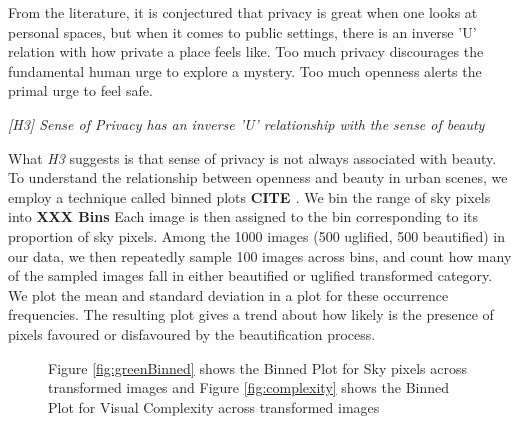 From the literature, it is conjectured that privacy is great when one
looks at personal spaces, but when it comes to public settings, there is an inverse 'U' relation with how private a place feels like. 
Too much privacy discourages the fundamental human urge to explore a mystery. Too much openness  alerts the primal urge to feel safe. 
\par
\textit{[H3] Sense of Privacy has an inverse 'U' relationship with the sense of beauty }
\par
What \textit{H3} suggests is that sense of privacy is not always associated with beauty. 
To understand the relationship between openness and beauty in urban scenes, we employ a technique called binned plots \textbf{CITE \cite{}}. We bin the range of sky pixels into \textbf{XXX Bins}%
Each image is then assigned to the bin corresponding to its proportion of sky pixels. %
Among the 1000 images (500 uglified, 500 beautified) in our data, we then repeatedly sample 100 images across bins, and count how many of the sampled images fall in either beautified or uglified transformed category. We plot the mean and standard deviation in a plot for these occurrence frequencies. The resulting plot gives a trend about how likely is the presence of pixels favoured or disfavoured by the beautification process. 


\begin{figure}[!t]
	\centering
	\hspace*{-5mm}
\vspace{-0.4cm}
\caption{ Figure \ref{fig:greenBinned} shows the Binned Plot for Sky pixels across transformed images and Figure \ref{fig:complexity} shows the Binned Plot for Visual Complexity across transformed images }
\vspace{-0.4cm}
\end{figure}

